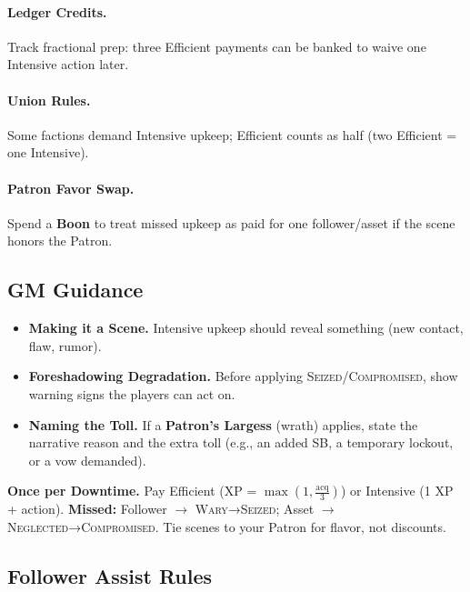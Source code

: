 \paragraph{Ledger Credits.} Track fractional prep: three Efficient payments can be banked to waive one Intensive action later.
\paragraph{Union Rules.} Some factions demand Intensive upkeep; Efficient counts as half (two Efficient = one Intensive).
\paragraph{Patron Favor Swap.} Spend a \textbf{Boon} to treat missed upkeep as paid for one follower/asset if the scene honors the Patron.

\subsection{GM Guidance}\label{subsec:upkeep-gm}
\begin{itemize}
\item \textbf{Making it a Scene.} Intensive upkeep should reveal something (new contact, flaw, rumor).
\item \textbf{Foreshadowing Degradation.} Before applying \textsc{Seized}/\textsc{Compromised}, show warning signs the players can act on.
\item \textbf{Naming the Toll.} If a \textbf{Patron's Largess} (wrath) applies, state the narrative reason and the extra toll (e.g., an added SB, a temporary lockout, or a vow demanded).
\end{itemize}

\begin{tcolorbox}[title={Quick Reference},colback=gray!5,colframe=black]
\textbf{Once per Downtime.} Pay Efficient (XP = $\max(1, \tfrac{\text{acq}}{3})$) or Intensive (1 XP + action). \textbf{Missed:} Follower $\to$ \textsc{Wary}→\textsc{Seized}; Asset $\to$ \textsc{Neglected}→\textsc{Compromised}. Tie scenes to your Patron for flavor, not discounts.
\end{tcolorbox}

\subsection{Follower Assist Rules}
\label{subsec:follower-assist}

